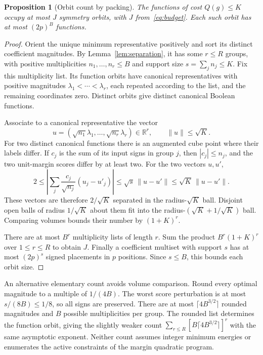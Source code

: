 \documentclass[11pt]{article}
\newtheorem{proposition}[theorem]{Proposition}
\newcommand{\R}{\mathbb R}
\begin{document}
\begin{proposition}[Orbit count by packing]\label{prop:orbits}
The functions of cost $Q(g)\le K$ occupy at most $J$ symmetry orbits, with $J$ from~\eqref{eq:budget}. Each such orbit has at most $(2p)^B$ functions.
\end{proposition}
\begin{proof}
Orient the unique minimum representative positively and sort its distinct coefficient magnitudes. By Lemma~\ref{lem:separation}, it has some $r\le R$ groups, with positive multiplicities $n_1,\ldots,n_r\le B$ and support size $s=\sum_jn_j\le K$. Fix this multiplicity list. Its function orbits have canonical representatives with positive magnitudes $\lambda_1<\cdots<\lambda_r$, each repeated according to the list, and the remaining coordinates zero. Distinct orbits give distinct canonical Boolean functions.

Associate to a canonical representative the vector
\[
 u=(\sqrt{n_1}\lambda_1,\ldots,\sqrt{n_r}\lambda_r)\in\R^r,
 \qquad \|u\|\le\sqrt K.
\]
For two distinct canonical functions there is an augmented cube point where their labels differ. If $c_j$ is the sum of its input signs in group $j$, then $|c_j|\le n_j$, and the two unit-margin scores differ by at least two. For the two vectors $u,u'$,
\[
 2\le\left|\sum_j\frac{c_j}{\sqrt{n_j}}(u_j-u'_j)\right|
 \le\sqrt{s}\,\|u-u'\|\le\sqrt K\,\|u-u'\|.
\]
These vectors are therefore $2/\sqrt K$ separated in the radius-$\sqrt K$ ball. Disjoint open balls of radius $1/\sqrt K$ about them fit into the radius-$(\sqrt K+1/\sqrt K)$ ball. Comparing volumes bounds their number by $(1+K)^r$.

There are at most $B^r$ multiplicity lists of length $r$. Sum the product $B^r(1+K)^r$ over $1\le r\le R$ to obtain $J$. Finally a coefficient multiset with support $s$ has at most $(2p)^s$ signed placements in $p$ positions. Since $s\le B$, this bounds each orbit size.
\end{proof}

An alternative elementary count avoids volume comparison. Round every optimal magnitude to a multiple of $1/(4B)$. The worst score perturbation is at most $s/(8B)\le1/8$, so all signs are preserved. There are at most $\lceil4B^{3/2}\rceil$ rounded magnitudes and $B$ possible multiplicities per group. The rounded list determines the function orbit, giving the slightly weaker count $\sum_{r\le R}[B\lceil4B^{3/2}\rceil]^r$ with the same asymptotic exponent. Neither count assumes integer minimum energies or enumerates the active constraints of the margin quadratic program.
\end{document}
